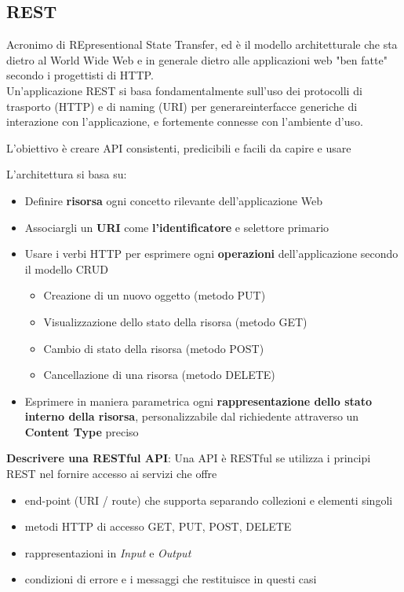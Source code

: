 \documentclass[a4paper,12pt]{article}
\begin{document}
\subsection{REST}
Acronimo di REpresentional State Transfer, ed è il modello architetturale che sta dietro al World Wide Web e in generale dietro alle applicazioni web "ben fatte" secondo i progettisti di HTTP. \\
Un’applicazione REST si basa fondamentalmente sull’uso dei protocolli di trasporto (HTTP) e di naming (URI) per generareinterfacce generiche di interazione con l’applicazione, e fortemente connesse con l’ambiente d’uso.
\begin{center}
L’obiettivo è creare API consistenti, predicibili e facili da capire e usare
\end{center}
L'architettura si basa su:
\begin{itemize}
  \item Definire \textbf{risorsa} ogni concetto rilevante dell’applicazione Web
  \item Associargli un \textbf{URI} come \textbf{l’identificatore} e selettore primario
  \item Usare i verbi HTTP per esprimere ogni \textbf{operazioni} dell’applicazione secondo il modello CRUD
  \begin{itemize}
    \item Creazione di un nuovo oggetto (metodo PUT)
    \item Visualizzazione dello stato della risorsa (metodo GET)
    \item Cambio di stato della risorsa (metodo POST)
    \item Cancellazione di una risorsa (metodo DELETE)
  \end{itemize}
  \item Esprimere in maniera parametrica ogni \textbf{rappresentazione dello stato interno della risorsa}, personalizzabile dal richiedente attraverso un \textbf{Content Type} preciso
\end{itemize}
\textbf{Descrivere una RESTful API}: Una API è RESTful se utilizza i principi REST nel fornire accesso ai servizi che offre
\begin{itemize}
  \item end-point (URI / route) che supporta separando collezioni e elementi singoli
  \item metodi HTTP di accesso GET, PUT, POST, DELETE
  \item rappresentazioni in \textit{Input} e \textit{Output}
  \item condizioni di errore e i messaggi che restituisce in questi casi
\end{itemize}
\end{document}

